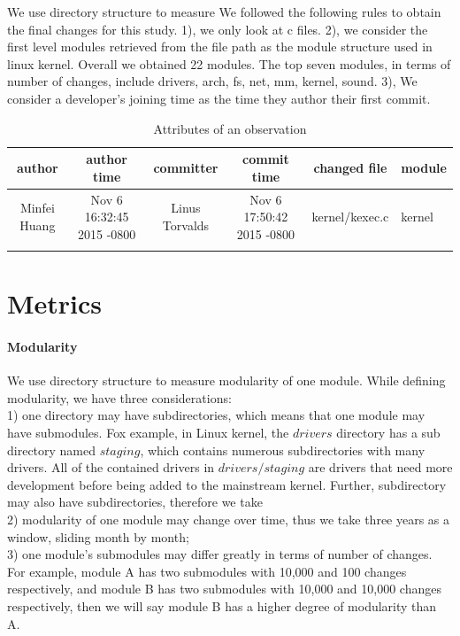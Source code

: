 \documentclass{sig-alternate-05-2015}
\begin{document}
We use directory structure to measure 
We followed the following rules to obtain the final changes for this study.
1), we only look at c files.
2), we consider the first level modules retrieved from the file path 
as the module structure used in linux kernel. Overall we obtained 22 modules.
The top seven modules, in terms of number of changes, include drivers, arch, fs, net, mm, kernel, sound.
3), We consider a developer's joining time as the time they author their first commit.

\begin{table}
\centering
\caption{Attributes of an observation}
\begin{tabular}{c|c|c|c|c|l} \hline
author & author time & committer & commit time & changed file & module\\ \hline
 Minfei Huang & Nov 6 16:32:45 2015 -0800 & Linus Torvalds & Nov 6 17:50:42 2015 -0800 & kernel/kexec.c &kernel\\ \hline
\label{tab:data}
\end{tabular}
\end{table}


\section{Metrics}
\paragraph{Modularity}
We use directory structure to measure modularity of one module. While defining modularity, we have three considerations: \\
1) one directory may have subdirectories, which means that one module may have submodules. Fox example, in Linux kernel, the $drivers$ directory has a sub directory named $staging$, 
which contains numerous subdirectories with many drivers. All of the contained drivers in $drivers/staging$ are drivers that need more development before being added to the mainstream kernel. Further, subdirectory may also have subdirectories, therefore we take\\
2) modularity of one module may change over time, thus we take three years as a window, sliding month by month;\\
3) one module's submodules may differ greatly in terms of number of changes. For example, module A has two submodules with 10,000 and 100 changes respectively, and module B has two submodules with 10,000 and 10,000 changes respectively, then we will say module B has a higher degree of modularity than A.
\end{document}
